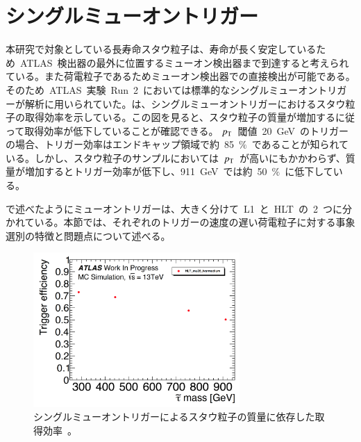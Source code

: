 \section{シングルミューオントリガー}
\label{sec:single}
本研究で対象としている長寿命スタウ粒子は、寿命が長く安定しているため~ATLAS~検出器の最外に位置するミューオン検出器まで到達すると考えられている。また荷電粒子であるためミューオン検出器での直接検出が可能である。そのため~ATLAS~実験~Run~2~においては標準的なシングルミューオントリガーが解析に用いられていた。は、シングルミューオントリガーにおけるスタウ粒子の取得効率を示している。この図を見ると、スタウ粒子の質量が増加するに従って取得効率が低下していることが確認できる。
$p_{\rm{T}}$~閾値~20~GeV~のトリガーの場合、トリガー効率はエンドキャップ領域で約~85~$\%$~であることが知られている。しかし、スタウ粒子のサンプルにおいては~$p_{\rm{T}}$~が高いにもかかわらず、質量が増加するとトリガー効率が低下し、911~GeV~では約~50~$\%$~に低下している。

で述べたようにミューオントリガーは、大きく分けて~L1~と~HLT~の~2~つに分かれている。本節では、それぞれのトリガーの速度の遅い荷電粒子に対する事象選別の特徴と問題点について述べる。

\begin{figure}[H]
        \centering   
        \includegraphics[width=0.7\textwidth,page=1]{img/pdf3/sumi.pdf}
        \caption[シングルミューオントリガーによるスタウ粒子の質量に依存した取得効率]{シングルミューオントリガーによるスタウ粒子の質量に依存した取得効率~\cite{MT:01}。}
        \label{fig:sumi1}
\end{figure}

